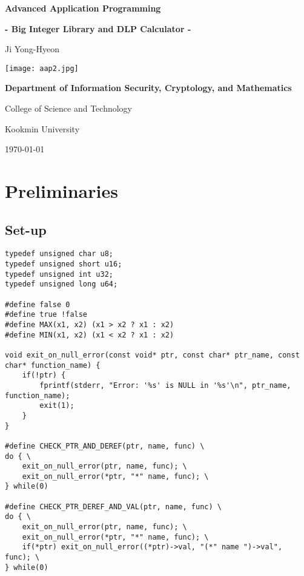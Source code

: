 \documentclass[12pt,openany]{book}
\theoremstyle{definition}
\begin{document}
	
	\begin{titlepage}
		\begin{center}
			{\Huge\textsf{\textbf{Advanced Application Programming}}\par}
			{\Large\textsf{\textcolor{red!70!white}{\bf - Big Integer Library and DLP Calculator -}}\par}
			\vspace{0.5in}
			{\Large Ji Yong-Hyeon\par}
			\vspace{1in}
			\texttt{[image: aap2.jpg]}\par
			\vspace{1in}
			\large
			{\bf Department of Information Security, Cryptology, and Mathematics\par}
			{College of Science and Technology\par}
			{Kookmin University\par}
			\vspace{.25in}
			{\large \today\par}
		\end{center}
	\end{titlepage}
	
	\tableofcontents
	
	\mainmatter
	
	\chapter{Preliminaries}
	\section{Set-up}
	\begin{lstlisting}[style=C, caption={},captionpos=t]
typedef unsigned char u8;
typedef unsigned short u16;
typedef unsigned int u32;
typedef unsigned long u64;

#define false 0
#define true !false
#define MAX(x1, x2) (x1 > x2 ? x1 : x2)
#define MIN(x1, x2) (x1 < x2 ? x1 : x2)

void exit_on_null_error(const void* ptr, const char* ptr_name, const char* function_name) {
	if(!ptr) {
		fprintf(stderr, "Error: '%s' is NULL in '%s'\n", ptr_name, function_name);
		exit(1);
	}
}

#define CHECK_PTR_AND_DEREF(ptr, name, func) \
do { \
	exit_on_null_error(ptr, name, func); \
	exit_on_null_error(*ptr, "*" name, func); \
} while(0)

#define CHECK_PTR_DEREF_AND_VAL(ptr, name, func) \
do { \
	exit_on_null_error(ptr, name, func); \
	exit_on_null_error(*ptr, "*" name, func); \
	if(*ptr) exit_on_null_error((*ptr)->val, "(*" name ")->val", func); \
} while(0)
	\end{lstlisting}
\end{document}
